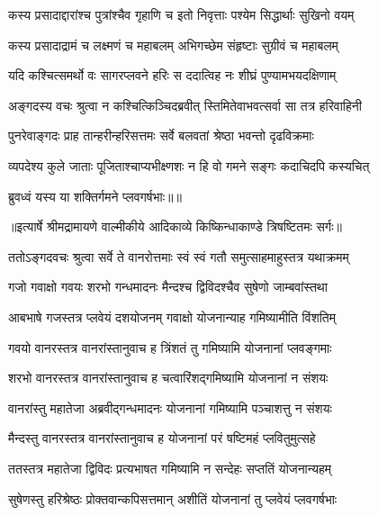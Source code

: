 \twolineshloka
{कस्य प्रसादाद्दारांश्च पुत्रांश्चैव गृहाणि च}
{इतो निवृत्ताः पश्येम सिद्धार्थाः सुखिनो वयम्} %

\twolineshloka
{कस्य प्रसादाद्रामं च लक्ष्मणं च महाबलम्}
{अभिगच्छेम संहृष्टाः सुग्रीवं च महाबलम्} %

\twolineshloka
{यदि कश्चित्समर्थो वः सागरप्लवने हरिः}
{स ददात्विह नः शीघ्रं पुण्यामभयदक्षिणाम्} %

\twolineshloka
{अङ्गदस्य वचः श्रुत्वा न कश्चित्किञ्चिदब्रवीत्}
{स्तिमितेवाभवत्सर्वा सा तत्र हरिवाहिनी} %

\twolineshloka
{पुनरेवाङ्गदः प्राह तान्हरीन्हरिसत्तमः}
{सर्वे बलवतां श्रेष्ठा भवन्तो दृढविक्रमाः} %

\twolineshloka
{व्यपदेश्य कुले जाताः पूजिताश्चाप्यभीक्ष्णशः}
{न हि वो गमने सङ्गः कदाचिदपि कस्यचित्} %

{ब्रुवध्वं यस्य या शक्तिर्गमने प्लवगर्षभाः॥॥} %

\addtocounter{shlokacount}{1}


{॥इत्यार्षे श्रीमद्रामायणे वाल्मीकीये आदिकाव्ये किष्किन्धाकाण्डे त्रिषष्टितमः सर्गः॥}


\twolineshloka
{ततोऽङ्गदवचः श्रुत्वा सर्वे ते वानरोत्तमाः}
{स्वं स्वं गतौ समुत्साहमाहुस्तत्र यथाक्रमम्} %

\twolineshloka
{गजो गवाक्षो गवयः शरभो गन्धमादनः}
{मैन्दश्च द्विविदश्चैव सुषेणो जाम्बवांस्तथा} %

\twolineshloka
{आबभाषे गजस्तत्र प्लवेयं दशयोजनम्}
{गवाक्षो योजनान्याह गमिष्यामीति विंशतिम्} %

\twolineshloka
{गवयो वानरस्तत्र वानरांस्तानुवाच ह}
{त्रिंशतं तु गमिष्यामि योजनानां प्लवङ्गमाः} %

\twolineshloka
{शरभो वानरस्तत्र वानरांस्तानुवाच ह}
{चत्वारिंशद्गमिष्यामि योजनानां न संशयः} %

\twolineshloka
{वानरांस्तु महातेजा अब्रवीद्गन्धमादनः}
{योजनानां गमिष्यामि पञ्चाशत्तु न संशयः} %

\twolineshloka
{मैन्दस्तु वानरस्तत्र वानरांस्तानुवाच ह}
{योजनानां परं षष्टिमहं प्लवितुमुत्सहे} %

\twolineshloka
{ततस्तत्र महातेजा द्विविदः प्रत्यभाषत}
{गमिष्यामि न सन्देहः सप्ततिं योजनान्यहम्} %

\twolineshloka
{सुषेणस्तु हरिश्रेष्ठः प्रोक्तवान्कपिसत्तमान्}
{अशीतिं योजनानां तु प्लवेयं प्लवगर्षभाः} %

